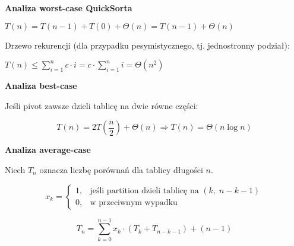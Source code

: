 \documentclass{article}
\begin{document}
\par\textbf{Analiza worst-case QuickSorta}

\par
$T(n) = T(n - 1) + T(0) + \Theta(n) = T(n - 1) + \Theta(n)$

\par
Drzewo rekurencji (dla przypadku pesymistycznego, tj. jednostronny podział):

\begin{center}
\end{center}


\par
$T(n) \leq \sum_{i=1}^{n} c \cdot i = c \cdot \sum_{i=1}^{n} i = \Theta(n^2)$
\vspace{1\baselineskip}

\par\textbf{Analiza best-case}

\par
Jeśli pivot zawsze dzieli tablicę na dwie równe części:

\[
T(n) = 2T\left(\frac{n}{2}\right) + \Theta(n)
\Rightarrow T(n) = \Theta(n \log n)
\]

\par\textbf{Analiza average-case}

\par
Niech $T_n$ oznacza liczbę porównań dla tablicy długości $n$.

\[
x_k =
\begin{cases}
    1, & \text{jeśli partition dzieli tablicę na } (k,\; n - k - 1) \\[0.5em]
    0, & \text{w przeciwnym wypadku}
\end{cases}
\]


\[
T_n = \sum_{k=0}^{n-1} x_k \cdot (T_k + T_{n-k-1}) + (n - 1)
\]
\end{document}

